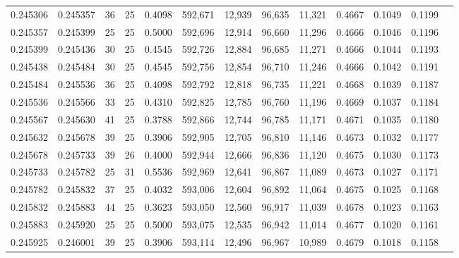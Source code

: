 \begin{tabular}{rrrrrrrrrrrrr}
0.245306 & 0.245357 &    36 &  25 &                                     0.4098 & 592,671 &  12,939 &  96,635 &  11,321 & 0.4667 & 0.1049 & 0.1199 \\
0.245357 & 0.245399 &    25 &  25 &                                     0.5000 & 592,696 &  12,914 &  96,660 &  11,296 & 0.4666 & 0.1046 & 0.1196 \\
0.245399 & 0.245436 &    30 &  25 &                                     0.4545 & 592,726 &  12,884 &  96,685 &  11,271 & 0.4666 & 0.1044 & 0.1193 \\
0.245438 & 0.245484 &    30 &  25 &                                     0.4545 & 592,756 &  12,854 &  96,710 &  11,246 & 0.4666 & 0.1042 & 0.1191 \\
0.245484 & 0.245536 &    36 &  25 &                                     0.4098 & 592,792 &  12,818 &  96,735 &  11,221 & 0.4668 & 0.1039 & 0.1187 \\
0.245536 & 0.245566 &    33 &  25 &                                     0.4310 & 592,825 &  12,785 &  96,760 &  11,196 & 0.4669 & 0.1037 & 0.1184 \\
0.245567 & 0.245630 &    41 &  25 &                                     0.3788 & 592,866 &  12,744 &  96,785 &  11,171 & 0.4671 & 0.1035 & 0.1180 \\
0.245632 & 0.245678 &    39 &  25 &                                     0.3906 & 592,905 &  12,705 &  96,810 &  11,146 & 0.4673 & 0.1032 & 0.1177 \\
0.245678 & 0.245733 &    39 &  26 &                                     0.4000 & 592,944 &  12,666 &  96,836 &  11,120 & 0.4675 & 0.1030 & 0.1173 \\
0.245733 & 0.245782 &    25 &  31 &                                     0.5536 & 592,969 &  12,641 &  96,867 &  11,089 & 0.4673 & 0.1027 & 0.1171 \\
0.245782 & 0.245832 &    37 &  25 &                                     0.4032 & 593,006 &  12,604 &  96,892 &  11,064 & 0.4675 & 0.1025 & 0.1168 \\
0.245832 & 0.245883 &    44 &  25 &                                     0.3623 & 593,050 &  12,560 &  96,917 &  11,039 & 0.4678 & 0.1023 & 0.1163 \\
0.245883 & 0.245920 &    25 &  25 &                                     0.5000 & 593,075 &  12,535 &  96,942 &  11,014 & 0.4677 & 0.1020 & 0.1161 \\
0.245925 & 0.246001 &    39 &  25 &                                     0.3906 & 593,114 &  12,496 &  96,967 &  10,989 & 0.4679 & 0.1018 & 0.1158 \\

\end{tabular}
